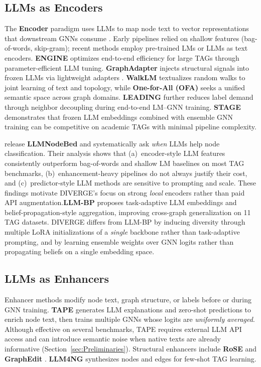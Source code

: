 \documentclass[a4paper,fleqn]{cas-sc}
\begin{document}
\subsection{LLMs as Encoders}
The \textbf{Encoder} paradigm uses LLMs to map node text to vector representations that downstream GNNs consume \citep{he2024harnessing, Huang2024GNNAdapters, Zhu2024EfficientTextualGraphs}. Early pipelines relied on shallow features (bag-of-words, skip-gram); recent methods employ pre-trained LMs or LLMs as text encoders. \textbf{ENGINE} \citep{Zhu2024EfficientTextualGraphs} optimizes end-to-end efficiency for large TAGs through parameter-efficient LLM tuning. \textbf{GraphAdapter} \citep{Huang2024GNNAdapters} injects structural signals into frozen LLMs via lightweight adapters \citep{Houlsby2019Adapters}. \textbf{WalkLM} \citep{Tan2023WalkLM} textualizes random walks to joint learning of text and topology, while \textbf{One-for-All (OFA)} \citep{liu2024oneforall} seeks a unified semantic space across graph domains. \textbf{LEADING} \citep{Xue2025LEADING} further reduces label demand through neighbor decoupling during end-to-end LM--GNN training. \textbf{STAGE} \citep{zolnai-lucas-etal-2024-stage} demonstrates that frozen LLM embeddings combined with ensemble GNN training can be competitive on academic TAGs with minimal pipeline complexity.

\citet{Wu2025LLMNode} release \textbf{LLMNodeBed} and systematically ask \emph{when} LLMs help node classification. Their analysis shows that (a)~encoder-style LLM features consistently outperform bag-of-words and shallow LM baselines on most TAG benchmarks, (b)~enhancement-heavy pipelines do not always justify their cost, and (c)~predictor-style LLM methods are sensitive to prompting and scale. These findings motivate DIVERGE's focus on strong \emph{local} encoders rather than paid API augmentation.\textbf{LLM-BP} \citep{wang2025llmbp} proposes task-adaptive LLM embeddings and belief-propagation-style aggregation, improving cross-graph generalization on 11 TAG datasets. DIVERGE differs from LLM-BP by inducing diversity through multiple LoRA initializations of a \emph{single} backbone rather than task-adaptive prompting, and by learning ensemble weights over GNN logits rather than propagating beliefs on a single embedding space.

\subsection{LLMs as Enhancers}
Enhancer methods modify node text, graph structure, or labels before or during GNN training. \textbf{TAPE} \citep{he2024harnessing} generates LLM explanations and zero-shot predictions to enrich node text, then trains multiple GNNs whose logits are \emph{uniformly averaged}. Although effective on several benchmarks, TAPE requires external LLM API access and can introduce semantic noise when native texts are already informative (Section~\ref{sec:Preliminaries}). Structural enhancers include \textbf{RoSE} \citep{Sun2026TopologicalEnhancerTAG} and \textbf{GraphEdit} \citep{guo2024graphedit}. \textbf{LLM4NG} \citep{Yu2025NodeGenerationTAG} synthesizes nodes and edges for few-shot TAG learning.
\end{document}
